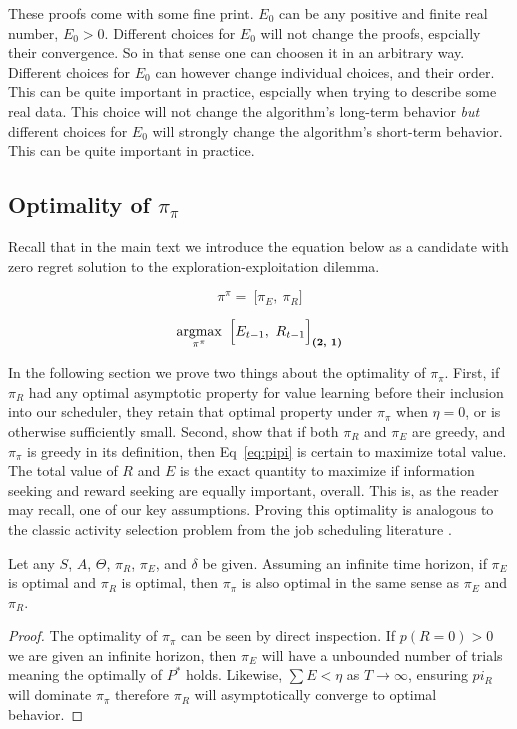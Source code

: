 These proofs come with some fine print. $E_0$ can be any positive and finite real number, $E_0 > 0$. Different choices for $E_0$ will not change the proofs, espcially their convergence. So in that sense one can choosen it in an arbitrary way. Different choices for $E_0$ can however change individual choices, and their order. This can be quite important in practice, espcially when trying to describe some real data.  This choice will not change the algorithm's long-term behavior \textit{but} different choices for $E_0$ will strongly change the algorithm's short-term behavior. This can be quite important in practice. 

\subsection*{Optimality of $\pi_{\pi}$} \label{sec:opt_pipi} 
Recall that in the main text we introduce the equation below as a candidate with zero regret solution to the exploration-exploitation dilemma.

\begin{equation}
\label{eq:pipi} 
\pi^{\pi} = \ \Big [ \pi_E,\ \pi_R \Big ]
\end{equation}

\begin{equation}
\label{eq:meta_greedy} 
	\operatorname*{argmax}_{\pi^{\pi}} \ \Big [ E_{t-1},\ R_{t-1} \Big ]_{\textbf{(2, 1)}}
\end{equation}

In the following section we prove two things about the optimality of $\pi_\pi$. First, if $\pi_R$ had any optimal asymptotic property for value learning before their inclusion into our scheduler, they retain that optimal property under $\pi_\pi$ when $\eta = 0$, or is otherwise sufficiently small. Second, show that if both $\pi_R$ and $\pi_E$ are greedy, and $\pi_\pi$ is greedy in its definition, then Eq~\ref{eq:pipi} is certain to maximize total value. The total value of $R$ and $E$ is the exact quantity to maximize if information seeking and reward seeking are equally important, overall. This is, as the reader may recall, one of our key assumptions. Proving this optimality is analogous to the classic activity selection problem from the job scheduling literature \cite{BellmanBook,Roughgarden2019}.

\begin{theorem}[$\pi_{\pi}$ is unbiased] \label{theorem:meta} 
	 Let any $S$, $A$, $\Theta$, $\pi_R$, $\pi_E$, and $\delta$ be given. Assuming an infinite time horizon, if $\pi_E$ is optimal and $\pi_R$ is optimal, then $\pi_{\pi}$ is also optimal in the same sense as $\pi_E$ and $\pi_R$. 
\end{theorem}
\begin{proof}
	The optimality of $\pi_{\pi}$ can be seen by direct inspection. If $p(R = 0) > 0$ we are given an infinite horizon, then $\pi_E$ will have a unbounded number of trials meaning the optimally of $P^*$ holds. Likewise, $\sum E < \eta$ as $T \rightarrow \infty$, ensuring $pi_R$ will dominate $\pi_{\pi}$ therefore $\pi_R$ will asymptotically converge to optimal behavior. 
\end{proof}

